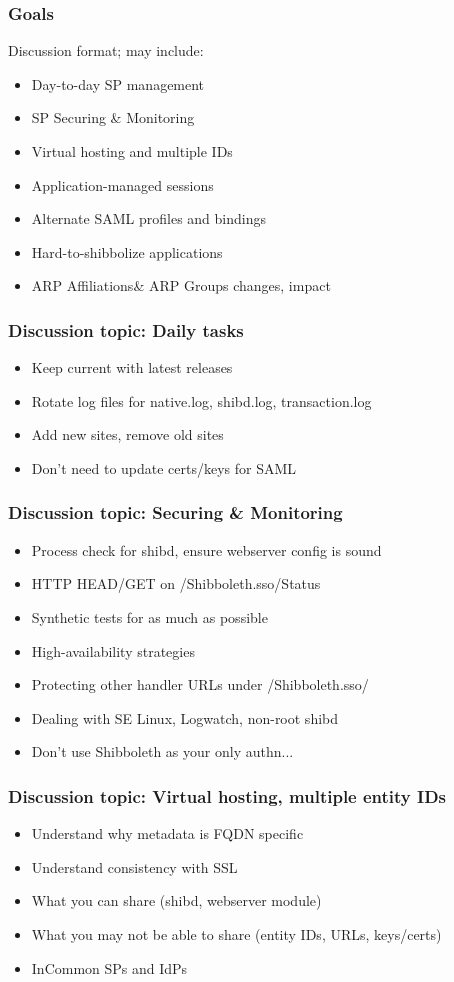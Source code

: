 


\begin{frame}
\frametitle{Goals}

Discussion format; may include:
\begin{itemize}
\item Day-to-day SP management
\item SP Securing \& Monitoring
\item Virtual hosting and multiple IDs
\item Application-managed sessions
\item Alternate SAML profiles and bindings
\item Hard-to-shibbolize applications
\item ARP Affiliations\& ARP Groups changes, impact
\end{itemize}
\end{frame}

\begin{frame}
\frametitle{Discussion topic: Daily tasks}
\begin{itemize}
\item Keep current with latest releases 
\item Rotate log files for native.log, shibd.log, transaction.log 
\item Add new sites, remove old sites 
\item Don't need to update certs/keys for SAML
\end{itemize}
\end{frame}

\begin{frame}
\frametitle{Discussion topic: Securing \& Monitoring}
\begin{itemize}
\item Process check for shibd, ensure webserver config is sound
\item HTTP HEAD/GET on /Shibboleth.sso/Status 
\item Synthetic tests for as much as possible 
\item High-availability strategies
\item Protecting other handler URLs under /Shibboleth.sso/ 
\item Dealing with SE Linux, Logwatch, non-root shibd
\item Don’t use Shibboleth as your only authn...
\end{itemize}
\end{frame}

\begin{frame}
\frametitle{Discussion topic: Virtual hosting, multiple entity IDs}
\begin{itemize}
\item Understand why metadata is FQDN specific
\item Understand consistency with SSL
\item What you can share (shibd, webserver module)
\item What you may not be able to share (entity IDs, URLs, keys/certs)
\item InCommon SPs and IdPs
\end{itemize}
\end{frame}

